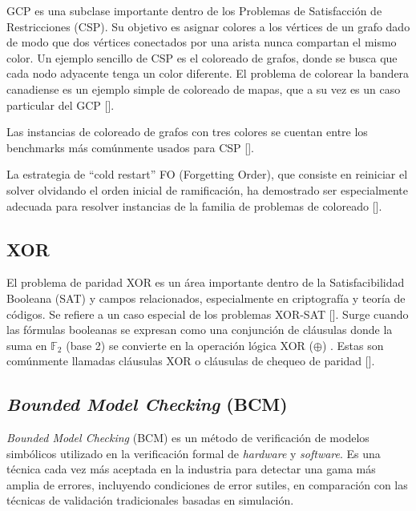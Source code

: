 GCP es una subclase importante dentro de los Problemas de Satisfacción de Restricciones (CSP). Su objetivo es asignar colores a los vértices de un grafo dado de modo que dos vértices conectados por una arista nunca compartan el mismo color. Un ejemplo sencillo de CSP es el coloreado de grafos, donde se busca que cada nodo adyacente tenga un color diferente. El problema de colorear la bandera canadiense es un ejemplo simple de coloreado de mapas, que a su vez es un caso particular del GCP [\cite{hoos1998sat}]. %

Las instancias de coloreado de grafos con tres colores se cuentan entre los benchmarks más comúnmente usados para CSP [\cite{hoos1998sat}]. %

La estrategia de “cold restart” FO (Forgetting Order), que consiste en reiniciar el solver olvidando el orden inicial de ramificación, ha demostrado ser especialmente adecuada para resolver instancias de la familia de problemas de coloreado [\cite{zhang2024revisiting}]. %

\subsection{XOR}
\label{subsec:xor}
El problema de paridad XOR es un área importante dentro de la Satisfacibilidad Booleana (SAT) y campos relacionados, especialmente en criptografía y teoría de códigos. Se refiere a un caso especial de los problemas XOR-SAT [\cite{nandi2024margin}]. %
Surge cuando las fórmulas booleanas se expresan como una conjunción de cláusulas donde la suma en $\mathbb{F}_2$ (base 2) se convierte en la operación lógica XOR ($\oplus$) \cite{trimoska2020parity}. %
Estas son comúnmente llamadas cláusulas XOR o cláusulas de chequeo de paridad [\cite{nandi2024margin}]. %

\subsection{\textit{Bounded Model Checking} (BCM)}
\label{subsec:bcm}
\textit{Bounded Model Checking} (BCM) es un método de verificación de modelos simbólicos utilizado en la verificación formal de \textit{hardware} y \textit{software}. Es una técnica cada vez más aceptada en la industria para detectar una gama más amplia de errores, incluyendo condiciones de error sutiles, en comparación con las técnicas de validación tradicionales basadas en simulación.

